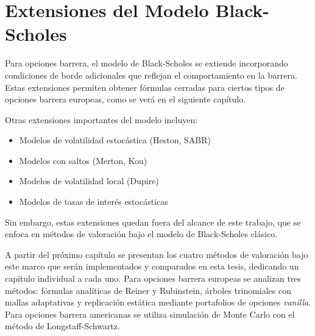 \section{Extensiones del Modelo Black-Scholes}

Para opciones barrera, el modelo de Black-Scholes se extiende incorporando condiciones de borde adicionales que reflejan el comportamiento en la barrera. Estas extensiones permiten obtener fórmulas cerradas para ciertos tipos de opciones barrera europeas, como se verá en el siguiente capítulo.

Otras extensiones importantes del modelo incluyen:
\begin{itemize}
    \item Modelos de volatilidad estocástica (Heston, SABR)
    \item Modelos con saltos (Merton, Kou)
    \item Modelos de volatilidad local (Dupire)
    \item Modelos de tasas de interés estocásticas
\end{itemize}

Sin embargo, estas extensiones quedan fuera del alcance de este trabajo, que se enfoca en métodos de valoración bajo el modelo de Black-Scholes clásico.

A partir del próximo capítulo se presentan los cuatro métodos de valoración bajo este marco que serán implementados y comparados en esta tesis, dedicando un capítulo individual a cada uno. Para opciones barrera europeas se analizan tres métodos: fórmulas analíticas de Reiner y Rubinstein, árboles trinomiales con mallas adaptativas y replicación estática mediante portafolios de opciones \textit{vanilla}. Para opciones barrera americanas se utiliza simulación de Monte Carlo con el método de Longstaff-Schwartz.
